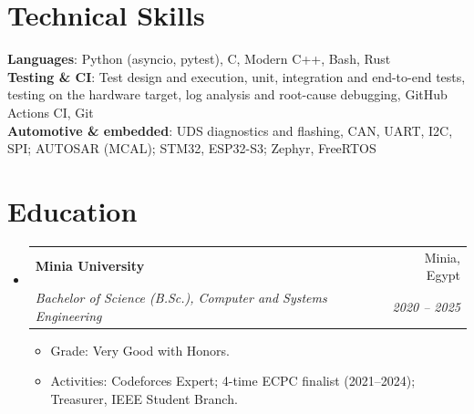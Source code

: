 \documentclass[letterpaper,11pt]{article}
\makeatletter
\newcommand{\resumeItem}[1]{
  \item\small{
    {#1 \vspace{-2pt}}
  }
}
\newcommand{\resumeSubheading}[4]{
  \vspace{-2pt}\item
    \begin{tabular*}{0.97\textwidth}[t]{l@{\extracolsep{\fill}}r}
      \textbf{#1} & #2 \\
      \textit{\small#3} & \textit{\small #4} \\
    \end{tabular*}\vspace{-7pt}
}
\newcommand{\resumeSubHeadingListStart}{\begin{itemize}[leftmargin=0.15in, label={}]}
\newcommand{\resumeSubHeadingListEnd}{\end{itemize}}
\newcommand{\resumeItemListStart}{\begin{itemize}}
\newcommand{\resumeItemListEnd}{\end{itemize}\vspace{-5pt}}
\makeatother
\begin{document}
%
\section{Technical Skills}
 \begin{itemize}[leftmargin=0.15in, label={}]
    \small{\item{
     \textbf{Languages}{: Python (asyncio, pytest), C, Modern C++, Bash, Rust} \\
     \textbf{Testing \& CI}{: Test design and execution, unit, integration and end-to-end tests, testing on the hardware target, log analysis and root-cause debugging, GitHub Actions CI, Git} \\
     \textbf{Automotive \& embedded}{: UDS diagnostics and flashing, CAN, UART, I2C, SPI; AUTOSAR (MCAL); STM32, ESP32-S3; Zephyr, FreeRTOS}
    }}
 \end{itemize}

\section{Education}
  \resumeSubHeadingListStart
    \resumeSubheading
      {Minia University}{Minia, Egypt}
      {Bachelor of Science (B.Sc.), Computer and Systems Engineering}{2020 -- 2025}
      \resumeItemListStart
        \resumeItem{Grade: Very Good with Honors.}
        \resumeItem{Activities: Codeforces Expert; 4-time ECPC finalist (2021--2024); Treasurer, IEEE Student Branch.}
      \resumeItemListEnd
  \resumeSubHeadingListEnd


\end{document}
